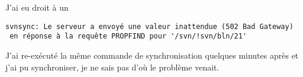 \documentclass[a4paper,twoside]{article}
\begin{document}
\begin{remarque}
J'ai eu droit à un 
\begin{verbatim}
svnsync: Le serveur a envoyé une valeur inattendue (502 Bad Gateway)
 en réponse à la requête PROPFIND pour '/svn/!svn/bln/21'
\end{verbatim}
J'ai re-exécuté la même commande de synchronisation quelques minutes après et j'ai pu synchroniser, je ne sais pas d'où le problème venait.
\end{remarque}


\printindex
\end{document}
